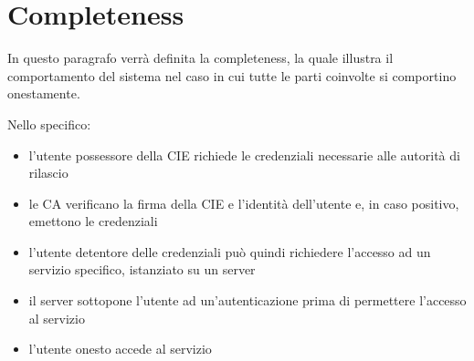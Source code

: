     
    \section{Completeness}
        In questo paragrafo verrà definita la completeness, la quale illustra il comportamento del sistema nel caso in cui tutte le parti coinvolte si comportino onestamente.
        
        \noindent Nello specifico:

        \begin{itemize}
            \item l'utente possessore della CIE richiede le credenziali necessarie alle autorità di rilascio

            \item le CA verificano la firma della CIE e l'identità dell'utente e, in caso positivo, emettono le credenziali 

            \item l'utente detentore delle credenziali può quindi richiedere l'accesso ad un servizio specifico, istanziato su un server

            \item il server sottopone l'utente ad un'autenticazione prima di permettere l'accesso al servizio

            \item l'utente onesto accede al servizio
        \end{itemize}